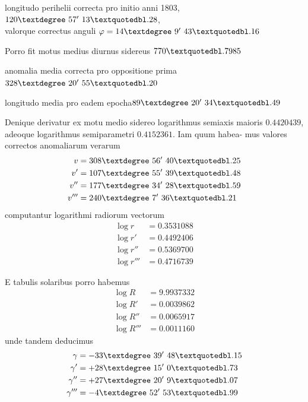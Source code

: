\documentclass[12pt,a4paper]{article}
\begin{document}
\begin{center}
longitudo perihelii correcta pro initio anni 1803, $120\textdegree\ 57'\ 13\textquotedbl.28$, \\
valorque correctus anguli $\varphi = 14\textdegree\ 9'\ 43\textquotedbl.16$
\end{center}

Porro fit motus medius diurnus sidereus $770\textquotedbl.7985$

anomalia media correcta pro oppositione prima\quad $328\textdegree\ 20'\ 55\textquotedbl.20$

longitudo media pro eadem epocha\quad $89\textdegree\ 20'\ 34\textquotedbl.49$

Denique derivatur ex motu medio sidereo logarithmus semiaxis maioris
$0.4420439$, adeoque logarithmus semiparametri $0.4152361$. Iam quum habea-
mus valores correctos anomaliarum verarum
\begin{align*}
v &= 308\textdegree\ 56'\ 40\textquotedbl.25 \\
v' &= 107\textdegree\ 55'\ 39\textquotedbl.48 \\
v'' &= 177\textdegree\ 34'\ 28\textquotedbl.59 \\
v''' &= 240\textdegree\ 7'\ 36\textquotedbl.21
\end{align*}
computantur logarithmi radiorum vectorum
\begin{align*}
\log r &= 0.3531088 \\
\log r' &= 0.4492406 \\
\log r'' &= 0.5369700 \\
\log r''' &= 0.4716739
\end{align*}

E tabulis solaribus porro habemus
\begin{align*}
\log R &= 9.9937332 \\
\log R' &= 0.0039862 \\
\log R'' &= 0.0065917 \\
\log R''' &= 0.0011160
\end{align*}
unde tandem deducimus
\begin{align*}
\gamma &= -33\textdegree\ 39'\ 48\textquotedbl.15 \\
\gamma' &= +28\textdegree\ 15'\ 0\textquotedbl.73 \\
\gamma'' &= +27\textdegree\ 20'\ 9\textquotedbl.07 \\
\gamma''' &= -4\textdegree\ 52'\ 53\textquotedbl.99
\end{align*}
\end{document}

